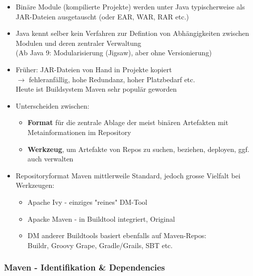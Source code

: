 \documentclass[a4paper]{article}
\begin{document}
	\begin{itemize}
		\item Binäre Module (kompilierte Projekte) werden unter Java typischerweise als JAR-Dateien ausgetauscht (oder EAR, WAR, RAR etc.)
		
		\item Java kennt selber kein Verfahren zur Defintion von Abhängigkeiten zwischen Modulen und deren zentraler Verwaltung\\
		(Ab Java 9: Modularisierung (Jigsaw), aber ohne Versionierung)
		
		\item Früher: JAR-Dateien von Hand in Projekte kopiert \\
		$\rightarrow$ fehleranfällig, hohe Redundanz, hoher Platzbedarf etc.\\
		Heute ist Buildsystem Maven sehr populär geworden
		
		\item Unterscheiden zwischen:
		\begin{itemize}
			\item \textbf{Format} für die zentrale Ablage der meist binären Artefakten mit Metainformationen im Repository
			\item \textbf{Werkzeug}, um Artefakte von Repos zu suchen, beziehen, deployen, ggf. auch verwalten
		\end{itemize}
	
		\item Repositoryformat Maven mittlerweile Standard, jedoch grosse Vielfalt bei Werkzeugen:
		\begin{itemize}
			\item Apache Ivy - einziges "reines" DM-Tool
			\item Apacke Maven - in Buildtool integriert, Original
			\item DM anderer Buildtools basiert ebenfalls auf Maven-Repos:\\
				Buildr, Groovy Grape, Gradle/Grails, SBT etc. 
		\end{itemize}
	\end{itemize}

		\subsubsection{Maven - Identifikation \& Dependencies}
		
\end{document}

